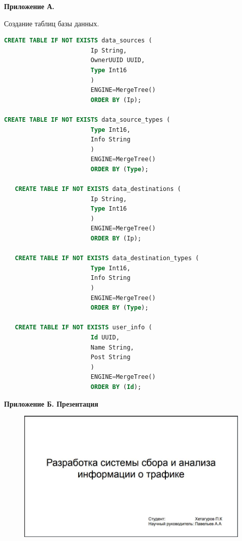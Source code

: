  \clearpage
 {\centering\textbf{Приложение А.} \par}
 {\centering Создание таблиц базы данных. \par}
\begin{lstlisting}[label={lst:appA}, language=SQL]   
CREATE TABLE IF NOT EXISTS data_sources (
                        Ip String,
                        OwnerUUID UUID,
                        Type Int16
                        )
                        ENGINE=MergeTree()
                        ORDER BY (Ip);
                        
CREATE TABLE IF NOT EXISTS data_source_types (
                        Type Int16,
                        Info String
                        )
                        ENGINE=MergeTree()
                        ORDER BY (Type);
                       
   CREATE TABLE IF NOT EXISTS data_destinations (
                        Ip String,
                        Type Int16
                        )
                        ENGINE=MergeTree()
                        ORDER BY (Ip);
                       
   CREATE TABLE IF NOT EXISTS data_destination_types (
                        Type Int16,
                        Info String
                        )
                        ENGINE=MergeTree()
                        ORDER BY (Type);
                       
   CREATE TABLE IF NOT EXISTS user_info (
                        Id UUID,
                        Name String,
                        Post String
                        )
                        ENGINE=MergeTree()
                        ORDER BY (Id);
\end{lstlisting}
 \newpage
{}
 {\centering\textbf{Приложение Б. Презентация} \par}
\begin{figure}[H]
	\centering
	\includegraphics[scale=0.35]{pr1.jpg}
\end{figure}
